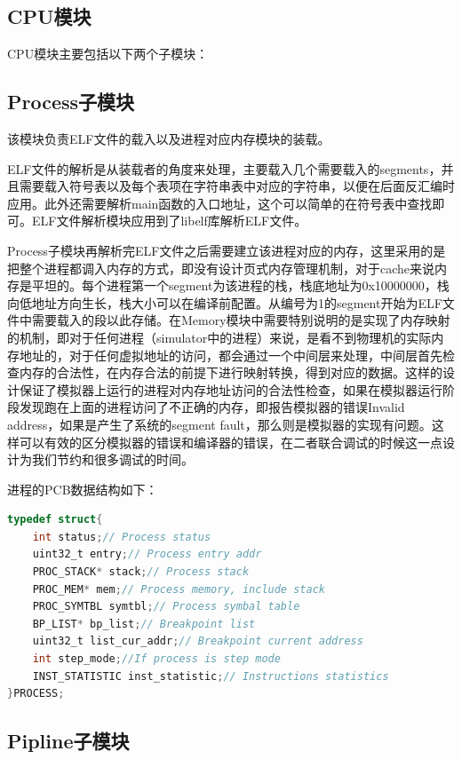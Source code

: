\documentclass[12pt,a4paper]{article}
\begin{document}
\subsection{CPU模块}

CPU模块主要包括以下两个子模块：

\subsection{Process子模块}

该模块负责ELF文件的载入以及进程对应内存模块的装载。

ELF文件的解析是从装载者的角度来处理，主要载入几个需要载入的segments，并且需要载入符号表以及每个表项在字符串表中对应的字符串，以便在后面反汇编时应用。此外还需要解析main函数的入口地址，这个可以简单的在符号表中查找即可。ELF文件解析模块应用到了libelf库解析ELF文件。

Process子模块再解析完ELF文件之后需要建立该进程对应的内存，这里采用的是把整个进程都调入内存的方式，即没有设计页式内存管理机制，对于cache来说内存是平坦的。每个进程第一个segment为该进程的栈，栈底地址为0x10000000，栈向低地址方向生长，栈大小可以在编译前配置。从编号为1的segment开始为ELF文件中需要载入的段以此存储。在Memory模块中需要特别说明的是实现了内存映射的机制，即对于任何进程（simulator中的进程）来说，是看不到物理机的实际内存地址的，对于任何虚拟地址的访问，都会通过一个中间层来处理，中间层首先检查内存的合法性，在内存合法的前提下进行映射转换，得到对应的数据。这样的设计保证了模拟器上运行的进程对内存地址访问的合法性检查，如果在模拟器运行阶段发现跑在上面的进程访问了不正确的内存，即报告模拟器的错误Invalid address，如果是产生了系统的segment fault，那么则是模拟器的实现有问题。这样可以有效的区分模拟器的错误和编译器的错误，在二者联合调试的时候这一点设计为我们节约和很多调试的时间。

进程的PCB数据结构如下：

\begin{lstlisting}[language={C}]
typedef struct{
    int status;// Process status
    uint32_t entry;// Process entry addr
    PROC_STACK* stack;// Process stack
    PROC_MEM* mem;// Process memory, include stack
    PROC_SYMTBL symtbl;// Process symbal table
    BP_LIST* bp_list;// Breakpoint list
    uint32_t list_cur_addr;// Breakpoint current address
    int step_mode;//If process is step mode 
    INST_STATISTIC inst_statistic;// Instructions statistics
}PROCESS;
\end{lstlisting}

\subsection{Pipline子模块}
\end{document}
